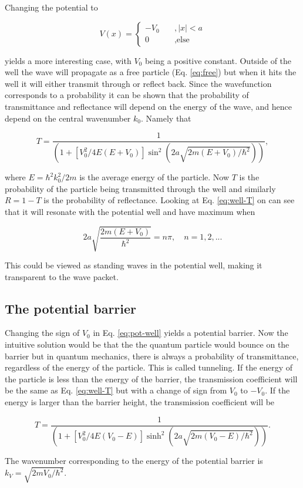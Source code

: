 Changing the potential to

\begin{equation}
  \label{eq:pot-well}
  V(x) = \begin{cases}
    -V_0 & \quad , |x|<a \\
    0 & \quad, \text{else}
  \end{cases}
\end{equation}

yields a more interesting case, with $V_0$ being a positive constant. Outside of the well the wave will propagate as a free particle (Eq. \eqref{eq:free}) but when it hits the well it will either transmit through or reflect back. Since the wavefunction corresponds to a probability it can be shown that the probability of transmittance and reflectance will depend on the energy of the wave, and hence depend on the central wavenumber $k_0$. Namely that

\begin{equation}
  \label{eq:well-T}
  T = \frac{1}{ \left( 1+ [V_0^2 /4 E (E+V_0)]\sin^2(2a\sqrt{2m(E+V_0)/\hbar^2})    \right)  },
\end{equation}

where $E =\hbar^2 k_0^2/2m$ is the average energy of the particle. Now $T$ is the probability of the particle being transmitted through the well and similarly $R=1-T$ is the probability of reflectance. Looking at Eq. \ref{eq:well-T} on can see that it will resonate with the potential well and have maximum when

\begin{equation}
  \label{eq:resonance}
  2a\sqrt{\frac{2m(E+V_0)}{\hbar^2}} = n \pi, \quad n= 1,2,...
\end{equation}

This could be viewed as standing waves in the potential well, making it transparent to the wave packet.


\subsection{The potential barrier}

Changing the sign of $V_0$ in Eq. \eqref{eq:pot-well} yields a potential barrier. Now the intuitive solution would be that the the quantum particle would bounce on the barrier but in quantum mechanics, there is always a probability of transmittance, regardless of the energy of the particle. This is called tunneling. If the energy of the particle is less than the energy of the barrier, the transmission coefficient will be the same as Eq. \eqref{eq:well-T} but with a change of sign from $V_0$ to $-V_0$. If the energy is larger than the barrier height, the transmission coefficient will be

\begin{equation}
  \label{eq:barr-T}
  T = \frac{1}{ \left( 1+ [V_0^2/4E(V_0-E)]\sinh^2 (2a\sqrt{2m(V_0-E)/\hbar^2})   \right)  }.
\end{equation}

The wavenumber corresponding to the energy of the potential barrier is $k_V = \sqrt{2mV_0/\hbar^2}$.
